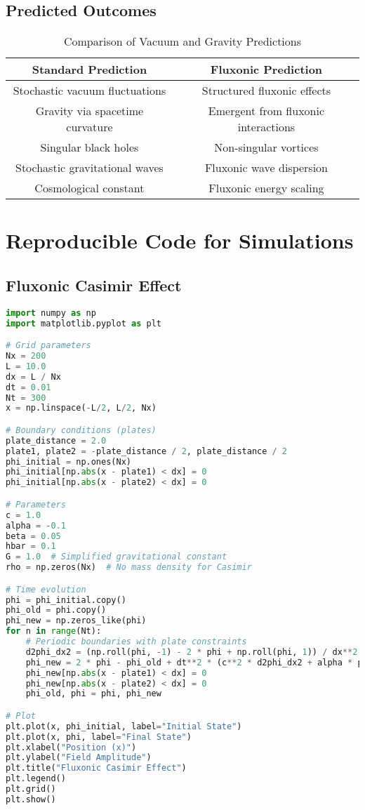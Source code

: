 \documentclass{article}
\begin{document}
\subsection{Predicted Outcomes}
\begin{table}[h]
    \centering
    \begin{tabular}{|c|c|}
        \hline
        \textbf{Standard Prediction} & \textbf{Fluxonic Prediction} \\
        \hline
        Stochastic vacuum fluctuations & Structured fluxonic effects \\
        Gravity via spacetime curvature & Emergent from fluxonic interactions \\
        Singular black holes & Non-singular vortices \\
        Stochastic gravitational waves & Fluxonic wave dispersion \\
        Cosmological constant & Fluxonic energy scaling \\
        \hline
    \end{tabular}
    \caption{Comparison of Vacuum and Gravity Predictions}
    \label{tab:predictions}
\end{table}

\section{Reproducible Code for Simulations}
\subsection{Fluxonic Casimir Effect}
\begin{lstlisting}[language=Python, caption=Fluxonic Casimir Effect, label=lst:casimir]
import numpy as np
import matplotlib.pyplot as plt

# Grid parameters
Nx = 200
L = 10.0
dx = L / Nx
dt = 0.01
Nt = 300
x = np.linspace(-L/2, L/2, Nx)

# Boundary conditions (plates)
plate_distance = 2.0
plate1, plate2 = -plate_distance / 2, plate_distance / 2
phi_initial = np.ones(Nx)
phi_initial[np.abs(x - plate1) < dx] = 0
phi_initial[np.abs(x - plate2) < dx] = 0

# Parameters
c = 1.0
alpha = -0.1
beta = 0.05
hbar = 0.1
G = 1.0  # Simplified gravitational constant
rho = np.zeros(Nx)  # No mass density for Casimir

# Time evolution
phi = phi_initial.copy()
phi_old = phi.copy()
phi_new = np.zeros_like(phi)
for n in range(Nt):
    # Periodic boundaries with plate constraints
    d2phi_dx2 = (np.roll(phi, -1) - 2 * phi + np.roll(phi, 1)) / dx**2
    phi_new = 2 * phi - phi_old + dt**2 * (c**2 * d2phi_dx2 + alpha * phi + beta * phi**3 - hbar * (phi - phi_old) / dt + 8 * np.pi * G * rho)
    phi_new[np.abs(x - plate1) < dx] = 0
    phi_new[np.abs(x - plate2) < dx] = 0
    phi_old, phi = phi, phi_new

# Plot
plt.plot(x, phi_initial, label="Initial State")
plt.plot(x, phi, label="Final State")
plt.xlabel("Position (x)")
plt.ylabel("Field Amplitude")
plt.title("Fluxonic Casimir Effect")
plt.legend()
plt.grid()
plt.show()
\end{lstlisting}
\end{document}
